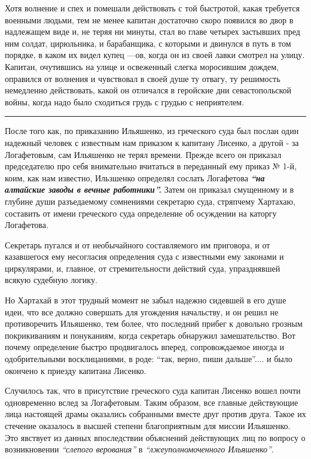 \documentclass[a4paper,20pt]{article}
\begin{document}
Хотя волнение и спех и помешали действовать с той
быстротой, какая требуется военными людьми, тем не менее
капитан достаточно скоро появился во двор в надлежащем виде и, не теряя ни
минуты, стал во главе четырех застывших пред ним солдат, цирюльника, и
барабанщика, с которыми и двинулся в путь в том порядке, в каком их видел
купец —ов, когда он из своей лавки смотрел на улицу. Капитан, очутившись на
улице и освеженный слегка моросившим дождем, оправился от волнения и чувствовал
в своей душе ту отвагу, ту решимость немедленно действовать, какой он отличался
в геройские дни севастопольской войны, когда надо было сходиться грудь с грудью
с неприятелем.

\par\noindent\rule{\textwidth}{0.4pt}

После того как, по приказанию Ильяшенко, из греческого суда 
был послан один надежный человек с
известным нам приказом к капитану Лисенко, а другой - за Логафетовым, 
сам Ильяшенко не терял времени. Прежде всего он приказал председателю про себя
внимательно вчитаться в переданный ему приказ № 1-й,
коим, как нам известно, Ильзшенко определял сослать
Логафетова \textbf{\em ``на алтайские заводы в вечные работники''.} 
Затем он приказал смущенному и в глубине души 
разъедаемому сомнениями секретарю суда, стряпчему Хартахаю,
составить от имени греческого суда определение об осуждении на каторгу Логафетова.

Секретарь пугался и от необычайного составляемого
им приговора, и от казавшегося ему несогласия определения суда с известными
ему законами и циркулярами, и, главное, от стремительности действий суда, упразднявшей всякую судебную
логику.

Но Хартахай в этот трудный момент не забыл
надежно сидевшей в его душе идеи, что все должно совершать для угождения начальству,
и он решил не противоречить Ильяшенко, тем более, что последний прибег
к довольно грозным покрикиваниям и понуканиям, когда
секретарь обнаружил замешательство. Вот почему определение быстро продвигалось вперед,
сопровождаемое иногда и одобрительными восклицаниями, в роде: ``так, верно,
пиши дальше''.... и было окончено к приезду капитана Лисенко.

Случилось так, что в присутствие греческого суда капитан Лисенко вошел почти
одновременно вслед за Логафетовым. Таким образом, все главные действующие лица
настоящей драмы оказались собранными вместе друг против друга. Такое их
стечение оказалось в высшей степени благоприятным для миссии Ильяшенко.
Это явствует из данных впоследствии объяснений действующих лиц по вопросу о возникновении \emph{``слепого верования''}
в \emph{``лжеуполномоченного Ильяшенко''}.
\end{document}
